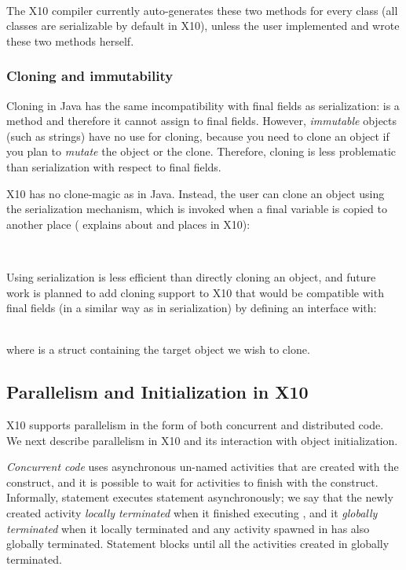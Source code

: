 ~~~~~~~~\\
The X10 compiler currently auto-generates these two methods for every class (all classes are serializable by default in X10),
    unless the user implemented  and wrote these two methods herself.

\subsubsection{Cloning and immutability}
Cloning in Java has the same incompatibility with final fields as serialization:
     is a method and therefore it cannot assign to final fields.
However, \emph{immutable} objects (such as strings) have no use for cloning,
    because you need to clone an object if you plan to \emph{mutate} the object or the clone.
Therefore, cloning is less problematic than serialization with respect to final fields.

X10 has no clone-magic as in Java.
Instead, the user can clone an object using the serialization mechanism,
    which is invoked when a final variable is copied to another place
    ( explains about  and places in X10):

~~~~~~~~

Using serialization is less efficient than directly cloning an object,
    and future work is planned to add cloning support to X10
    that would be compatible with final fields
    (in a similar way as in serialization) by defining an interface  with:

~~~~~~~~\\
where  is a struct containing the target object we wish to clone.




\subsection{Parallelism and Initialization in X10}
\label{Section:Parallelism}
X10 supports parallelism in the form of both concurrent and distributed code.
We next describe parallelism in X10 and its interaction with object initialization.

\emph{Concurrent code} uses asynchronous un-named activities that are created with the  construct,
    and it is possible to wait for activities to finish with the  construct.
Informally, statement  executes statement  asynchronously;
    we say that the newly created activity \emph{locally terminated} when it finished executing ,
        and it \emph{globally terminated} when it locally terminated and any activity spawned in 
            has also globally terminated.
Statement  blocks until all the activities created in  globally terminated.

